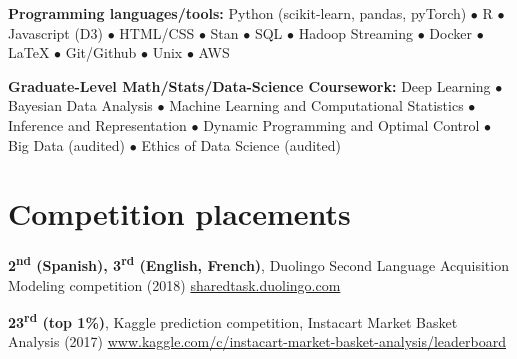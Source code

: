 \documentclass[10pt]{my_cv}
\begin{document}
\hrulefill

\begin{addmargin}[1em]{0em}
\textbf{Programming languages/tools:}
Python (scikit-learn, pandas, pyTorch) $\bullet$ R $\bullet$ Javascript (D3)
$\bullet$ HTML/CSS $\bullet$ Stan $\bullet$ SQL $\bullet$
Hadoop Streaming $\bullet$ Docker $\bullet$ LaTeX $\bullet$ Git/Github $\bullet$
Unix $\bullet$ AWS

\textbf{Graduate-Level Math/Stats/Data-Science Coursework:}
Deep Learning $\bullet$ Bayesian Data Analysis  $\bullet$ Machine Learning and Computational Statistics $\bullet$ 
Inference and Representation
$\bullet$ Dynamic Programming and Optimal Control $\bullet$
Big Data (audited) $\bullet$ Ethics of Data Science (audited)

\end{addmargin}


\section{Competition placements}

\hrulefill

\begin{addmargin}[1em]{0em}

  \textbf{2\textsuperscript{nd} (Spanish), 3\textsuperscript{rd}
    (English, French)}, Duolingo Second Language Acquisition Modeling
  competition (2018) \newline
  \-\hspace{1em}\href{http://sharedtask.duolingo.com}{sharedtask.duolingo.com}

  \textbf{23\textsuperscript{rd} (top 1\%)}, Kaggle prediction
    competition, Instacart Market Basket Analysis (2017) \newline
    \-\hspace{1em} \href{https://www.kaggle.com/c/instacart-market-basket-analysis/leaderboard}{www.kaggle.com/c/instacart-market-basket-analysis/leaderboard}




\end{addmargin}
\end{document}
